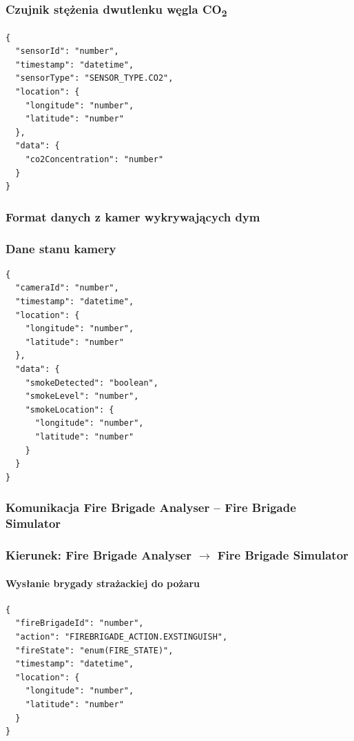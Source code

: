 \documentclass[11pt,a4paper]{article}
\begin{document}
\subsubsection*{Czujnik stężenia dwutlenku węgla CO\textsubscript{2}}

\begin{verbatim}
{
  "sensorId": "number",
  "timestamp": "datetime",
  "sensorType": "SENSOR_TYPE.CO2",
  "location": {
    "longitude": "number",
    "latitude": "number"
  },
  "data": {
    "co2Concentration": "number"
  }
}
\end{verbatim}

\subsubsection{Format danych z kamer wykrywających dym}

\subsubsection*{Dane stanu kamery}

\begin{verbatim}
{
  "cameraId": "number",
  "timestamp": "datetime",
  "location": {
    "longitude": "number",
    "latitude": "number"
  },
  "data": {
    "smokeDetected": "boolean",
    "smokeLevel": "number",
    "smokeLocation": {
      "longitude": "number",
      "latitude": "number"
    }
  }
}
\end{verbatim}

\subsubsection{Komunikacja Fire Brigade Analyser -- Fire Brigade Simulator}

\subsubsection*{Kierunek: Fire Brigade Analyser $\rightarrow$ Fire Brigade Simulator}

\paragraph{Wysłanie brygady strażackiej do pożaru}

\begin{verbatim}
{
  "fireBrigadeId": "number",
  "action": "FIREBRIGADE_ACTION.EXSTINGUISH",
  "fireState": "enum(FIRE_STATE)",
  "timestamp": "datetime",
  "location": {
    "longitude": "number",
    "latitude": "number"
  }
}
\end{verbatim}
\end{document}
